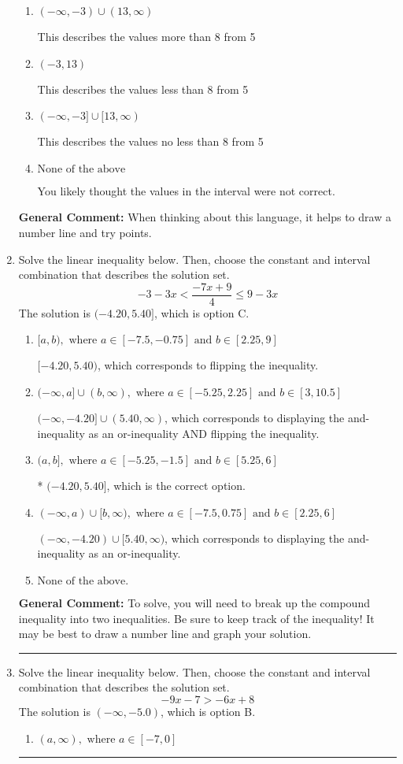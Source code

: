 \documentclass{extbook}[14pt]
\newcommand{\litem}[1]{\item #1

\rule{\textwidth}{0.4pt}}
\begin{document}
\begin{enumerate}
{\begin{enumerate}[label=\Alph*.]
This describes the values no more than 8 from 5
\item \( (-\infty, -3) \cup (13, \infty) \)

This describes the values more than 8 from 5
\item \( (-3, 13) \)

This describes the values less than 8 from 5
\item \( (-\infty, -3] \cup [13, \infty) \)

This describes the values no less than 8 from 5
\item \( \text{None of the above} \)

You likely thought the values in the interval were not correct.
\end{enumerate}

\textbf{General Comment:} When thinking about this language, it helps to draw a number line and try points.
}
\litem{
Solve the linear inequality below. Then, choose the constant and interval combination that describes the solution set.
\[ -3 - 3 x < \frac{-7 x + 9}{4} \leq 9 - 3 x \]The solution is \( (-4.20, 5.40] \), which is option C.\begin{enumerate}[label=\Alph*.]
\item \( [a, b), \text{ where } a \in [-7.5, -0.75] \text{ and } b \in [2.25, 9] \)

$[-4.20, 5.40)$, which corresponds to flipping the inequality.
\item \( (-\infty, a] \cup (b, \infty), \text{ where } a \in [-5.25, 2.25] \text{ and } b \in [3, 10.5] \)

$(-\infty, -4.20] \cup (5.40, \infty)$, which corresponds to displaying the and-inequality as an or-inequality AND flipping the inequality.
\item \( (a, b], \text{ where } a \in [-5.25, -1.5] \text{ and } b \in [5.25, 6] \)

* $(-4.20, 5.40]$, which is the correct option.
\item \( (-\infty, a) \cup [b, \infty), \text{ where } a \in [-7.5, 0.75] \text{ and } b \in [2.25, 6] \)

$(-\infty, -4.20) \cup [5.40, \infty)$, which corresponds to displaying the and-inequality as an or-inequality.
\item \( \text{None of the above.} \)


\end{enumerate}

\textbf{General Comment:} To solve, you will need to break up the compound inequality into two inequalities. Be sure to keep track of the inequality! It may be best to draw a number line and graph your solution.
}
\litem{
Solve the linear inequality below. Then, choose the constant and interval combination that describes the solution set.
\[ -9x -7 > -6x + 8 \]The solution is \( (-\infty, -5.0) \), which is option B.\begin{enumerate}[label=\Alph*.]
\item \( (a, \infty), \text{ where } a \in [-7, 0] \)


\end{enumerate}}
\end{enumerate}
\end{document}
